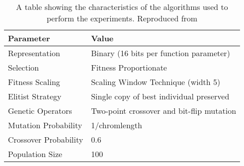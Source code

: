 \begin{table} [h]
    \begin{tabular}{|l|l|}
        \hline
        \textbf{Parameter}      & \textbf{Value}                            \\
        \hline
        Representation          & Binary (16 bits per function parameter)   \\
        Selection               & Fitness Proportionate                     \\
        Fitness Scaling         & Scaling Window Technique (width 5)        \\
        Elitist Strategy        & Single copy of best individual preserved  \\
        Genetic Operators       & Two-point crossover and bit-flip mutation \\
        Mutation Probability    & 1/chromlength                             \\
        Crossover Probability   & 0.6                                       \\
        Population Size         & 100                                       \\
        \hline

    \end{tabular}
    \caption{A table showing the characteristics of the algorithms used to perform the experiments. Reproduced from \cite{original-paper}}
    \label{tab:parameter-table}
\end{table}
